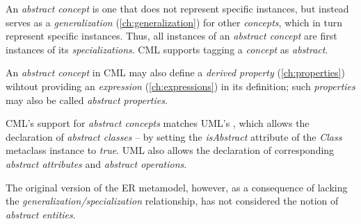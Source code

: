 An \emph{abstract concept} is one that does not represent specific instances,
but instead serves as a \emph{generalization} (\ref{ch:generalization}) 
for other \emph{concepts},
which in turn represent specific instances.
Thus, all instances of an \emph{abstract concept}
are first instances of its \emph{specializations}.
CML supports tagging a \emph{concept} as \emph{abstract}.

An \emph{abstract concept} in CML may also define a \emph{derived property} (\ref{ch:properties})
wihtout providing an \emph{expression} (\ref{ch:expressions}) in its definition;
such \emph{properties} may also be called \emph{abstract properties}.

CML's support for \emph{abstract concepts} matches UML's \cite{uml},
which allows the declaration of \emph{abstract classes}
-- by setting the \emph{isAbstract} attribute of the \emph{Class} metaclass instance to \emph{true}.
UML also allows the declaration of corresponding \emph{abstract attributes} and \emph{abstract operations}.

The original version of the ER \cite{er} metamodel, however,
as a consequence of lacking the \emph{generalization/specialization} relationship,
has not considered the notion of \emph{abstract entities}.


